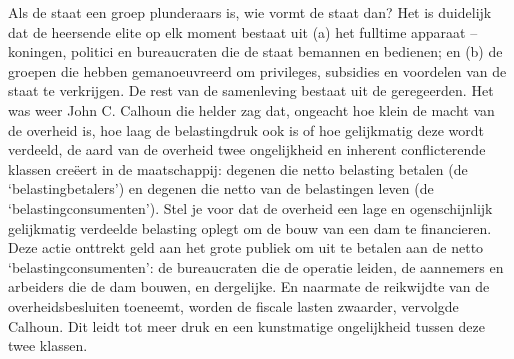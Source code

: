 \documentclass[
  a5paper,
  smalldemyvopaper,10pt,twoside,onecolumn,openright,extrafontsizes,hidelinks]{memoir}
\begin{document}
Als de staat een groep plunderaars is, wie vormt de staat dan? Het is
duidelijk dat de heersende elite op elk moment bestaat uit (a) het
fulltime apparaat -- koningen, politici en bureaucraten die de staat
bemannen en bedienen; en (b) de groepen die hebben gemanoeuvreerd om
privileges, subsidies en voordelen van de staat te verkrijgen. De rest
van de samenleving bestaat uit de geregeerden. Het was weer John C.
Calhoun die helder zag dat, ongeacht hoe klein de macht van de overheid
is, hoe laag de belastingdruk ook is of hoe gelijkmatig deze wordt
verdeeld, de aard van de overheid twee ongelijkheid en inherent
conflicterende klassen creëert in de maatschappij: degenen die netto
belasting betalen (de `belastingbetalers') en degenen die netto van de
belastingen leven (de `belastingconsumenten'). Stel je voor dat de
overheid een lage en ogenschijnlijk gelijkmatig verdeelde belasting
oplegt om de bouw van een dam te financieren. Deze actie onttrekt geld
aan het grote publiek om uit te betalen aan de netto
`belastingconsumenten': de bureaucraten die de operatie leiden, de
aannemers en arbeiders die de dam bouwen, en dergelijke. En naarmate de
reikwijdte van de overheidsbesluiten toeneemt, worden de fiscale lasten
zwaarder, vervolgde Calhoun. Dit leidt tot meer druk en een kunstmatige
ongelijkheid tussen deze twee klassen.
\end{document}

